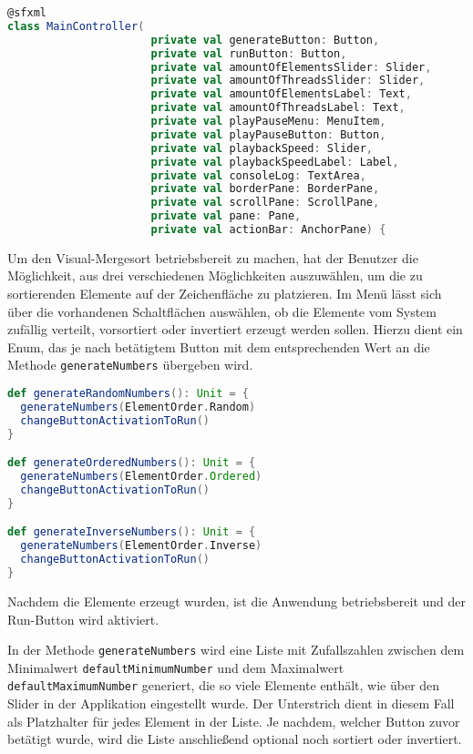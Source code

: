 \begin{lstlisting}[language=Scala,caption=Erzeugen der Elemente und Initialisierung der Anwendung durch den Benutzer]
@sfxml
class MainController(
                      private val generateButton: Button,
                      private val runButton: Button,
                      private val amountOfElementsSlider: Slider,
                      private val amountOfThreadsSlider: Slider,
                      private val amountOfElementsLabel: Text,
                      private val amountOfThreadsLabel: Text,
                      private val playPauseMenu: MenuItem,
                      private val playPauseButton: Button,
                      private val playbackSpeed: Slider,
                      private val playbackSpeedLabel: Label,
                      private val consoleLog: TextArea,
                      private val borderPane: BorderPane,
                      private val scrollPane: ScrollPane,
                      private val pane: Pane,
                      private val actionBar: AnchorPane) {
\end{lstlisting}

Um den Visual-Mergesort betriebsbereit zu machen, hat der Benutzer die Möglichkeit, aus drei verschiedenen Möglichkeiten auszuwählen, um die zu sortierenden Elemente auf der Zeichenfläche zu platzieren. Im Menü lässt sich über die vorhandenen Schaltflächen auswählen, ob die Elemente vom System zufällig verteilt, vorsortiert oder invertiert erzeugt werden sollen. Hierzu dient ein Enum, das je nach betätigtem Button mit dem entsprechenden Wert an die Methode \texttt{generateNumbers} übergeben wird.

\begin{lstlisting}[language=Scala]
def generateRandomNumbers(): Unit = {
  generateNumbers(ElementOrder.Random)
  changeButtonActivationToRun()
}

def generateOrderedNumbers(): Unit = {
  generateNumbers(ElementOrder.Ordered)
  changeButtonActivationToRun()
}

def generateInverseNumbers(): Unit = {
  generateNumbers(ElementOrder.Inverse)
  changeButtonActivationToRun()
}
\end{lstlisting}

Nachdem die Elemente erzeugt wurden, ist die Anwendung betriebsbereit und der Run-Button wird aktiviert.

In der Methode \texttt{generateNumbers} wird eine Liste mit Zufallszahlen zwischen dem Minimalwert \texttt{defaultMinimumNumber} und dem Maximalwert \texttt{defaultMaximumNumber} generiert, die so viele Elemente enthält, wie über den Slider in der Applikation eingestellt wurde. Der Unterstrich dient in diesem Fall als Platzhalter für jedes Element in der Liste. Je nachdem, welcher Button zuvor betätigt wurde, wird die Liste  anschließend optional noch sortiert oder invertiert.

